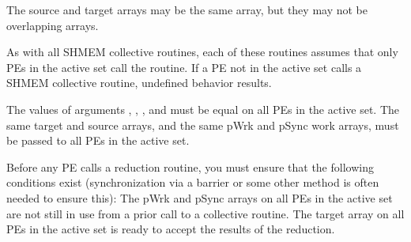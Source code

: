 {{ The source and target arrays may be the same array, but they may not be
 overlapping arrays.

 As with all SHMEM collective routines, each of these routines assumes
 that only \ac{PE}s in the active set call the routine. If a \ac{PE} not in the
 active set calls a SHMEM collective	 routine, undefined behavior
 results.

 The values of arguments , , , and 
 must be equal on all \ac{PE}s in the active set. The same target and source
 arrays, and the same pWrk and pSync work arrays, must be passed to all
 \ac{PE}s in the active set.

 Before any \ac{PE}	calls a reduction routine, you must ensure that the
 following conditions exist (synchronization via a barrier or some other
 method is often needed to ensure this): The pWrk and pSync arrays on
 all \ac{PE}s in the active set are not still in use from a prior call	 to a
 collective \openshmem routine. The target array on all \ac{PE}s in the active
 set is ready to accept the results of the reduction.

}}
